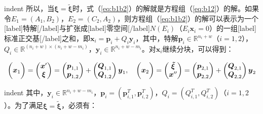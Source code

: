 \documentclass[UTF8,nofonts]{ctexart}
\begin{document}
indent 所以，当$\boldsymbol{\xi}=\boldsymbol{\tilde{\xi}}$时，式（\ref{eq:b1b2}）的解就是方程组（\ref{eq:b12}）的解。如果令$E_1=\left(A_1,B_2\right)$，$E_2=\left(C_2,A_2\right)$，则方程组（\ref{eq:b1b2}）的解可以表示为一个[label]特解[/label]与扩张成[label]零空间[/label]$N(E_i)$（$E_{i}\boldsymbol{x}_i=0$）的一组[label]标准正交基[/label]之和，即$\boldsymbol{x}_i=\boldsymbol{p}_{i}+Q_i\boldsymbol{y}_i$，其中，特解$\boldsymbol{p}_i\in\mathbb{R}^{n_i+w}$（$i=1,2$），$Q_i\in\mathbb{R}^{(n_i+w)\times(n_i+w-m_i)}$，$\boldsymbol{y}_i\in\mathbb{R}^{n_i+w-m_i}$。对$\boldsymbol{x}_i$继续分块，可以得到：

\begin{equation}
\label{eq:y1y2}
\begin{pmatrix}
\multicolumn{1}{c}{\multirow{2}{*}{$\boldsymbol{x}_1$}}\\
\\
\end{pmatrix}=
\begin{pmatrix}
\boldsymbol{x}'\\
\boldsymbol{\xi}
\end{pmatrix}=
\begin{pmatrix}
\boldsymbol{p}_{1,1}\\
\boldsymbol{p}_{1,2}
\end{pmatrix}+
\begin{pmatrix}
\boldsymbol{Q}_{1,1}\\
\boldsymbol{Q}_{1,2}
\end{pmatrix}\boldsymbol{y}_1,\quad
\begin{pmatrix}
\multicolumn{1}{c}{\multirow{2}{*}{$\boldsymbol{x}_2$}}\\
\\
\end{pmatrix}=
\begin{pmatrix}
\boldsymbol{\tilde{\xi}}\\
\boldsymbol{x}''
\end{pmatrix}=
\begin{pmatrix}
\boldsymbol{p}_{2,1}\\
\boldsymbol{p}_{2,2}
\end{pmatrix}+
\begin{pmatrix}
\boldsymbol{Q}_{2,1}\\
\boldsymbol{Q}_{2,2}
\end{pmatrix}\boldsymbol{y}_2
\end{equation}

indent 其中，$\boldsymbol{y}_i\in\mathbb{R}^{n_i+w-m_i}$，$\boldsymbol{p}_i=(\boldsymbol{p}_{i,1}^T,\boldsymbol{p}_{i,2}^T)$，$Q_i=(Q_{i,1}^T,Q_{i,2}^T)$（$i=1,2$）。为了满足$\boldsymbol{\xi}=\boldsymbol{\tilde{\xi}}$，必须有：
\end{document}
